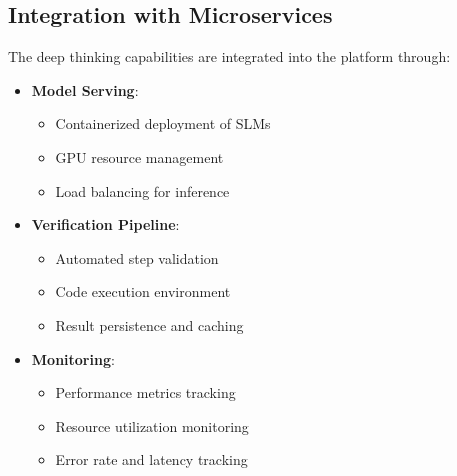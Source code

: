 \subsection{Integration with Microservices}

The deep thinking capabilities are integrated into the \sysname{} platform through:

\begin{itemize}
    \item \textbf{Model Serving}:
    \begin{itemize}
        \item Containerized deployment of SLMs
        \item GPU resource management
        \item Load balancing for inference
    \end{itemize}
    \item \textbf{Verification Pipeline}:
    \begin{itemize}
        \item Automated step validation
        \item Code execution environment
        \item Result persistence and caching
    \end{itemize}
    \item \textbf{Monitoring}:
    \begin{itemize}
        \item Performance metrics tracking
        \item Resource utilization monitoring
        \item Error rate and latency tracking
    \end{itemize}
\end{itemize}

